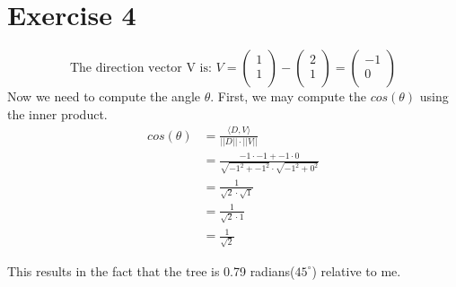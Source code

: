 \documentclass[a4paper]{article}
\begin{document}
\section*{Exercise 4}
\[
\text{The direction vector V is: } V =
\left(
\begin{array}{c}
1 \\
1 \\
\end{array}
\right)
-
\left(
\begin{array}{c}
2 \\
1 \\
\end{array}
\right)
=
\left(
\begin{array}{c}
-1 \\
0 \\
\end{array}
\right)
\]
Now we need to compute the angle $\theta$. First, we may compute the $cos(\theta)$ using the inner product.
\begin{align*}
  cos(\theta) &= \frac{\langle D, V \rangle}{||D|| \cdot ||V||} \\
              &= \frac{-1 \cdot -1 + -1 \cdot 0}{\sqrt{-1^2 + -1^2} \cdot \sqrt{-1^2 + 0^2}} \\
              &= \frac{1}{\sqrt{2} \cdot \sqrt{1}} \\
              &= \frac{1}{\sqrt{2} \cdot 1} \\
              &= \frac{1}{\sqrt{2}}
\end{align*}

This results in the fact that the tree is 0.79 radians($45^\circ$) relative to me.
\end{document}
